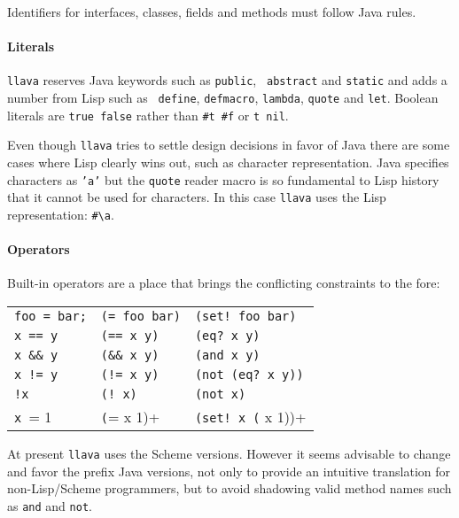 \documentclass{acm-final/sig-alternate-modified}
\begin{document}
Identifiers for interfaces, classes, fields and methods must follow
Java rules.

\paragraph{Literals}

{\tt llava} reserves Java keywords such as {\tt public}, {\tt
abstract} and {\tt static} and adds a number from Lisp such as {\tt
define}, {\tt defmacro}, {\tt lambda}, {\tt quote} and {\tt let}.
Boolean literals are {\tt true false} rather than {\tt \#t \#f} or
{\tt t nil}.

Even though {\tt llava} tries to settle design decisions in favor of
Java there are some cases where Lisp clearly wins out, such as
character representation.  Java specifies characters as {\tt 'a'} but
the {\tt quote} reader macro is so fundamental to Lisp history that it
cannot be used for characters.  In this case {\tt llava} uses the Lisp
representation: \verb+#\a+.

\paragraph{Operators}

Built-in operators are a place that brings the conflicting constraints
to the fore:

\small
\begin{tabular}{l|l|l}
\verb+foo = bar;+        & \verb+(= foo bar)+      & \verb+(set! foo bar)+ \\
\verb+x == y+            & \verb+(== x y)+         & \verb+(eq? x y)+ \\
\verb+x && y+            & \verb+(&& x y)+         & \verb+(and x y)+ \\
\verb+x != y+            & \verb+(!= x y)+         & \verb+(not (eq? x y))+ \\
\verb+!x+                & \verb+(! x)+            & \verb+(not x)+ \\
\verb+x += 1             & \verb+(+= x 1)+         & \verb+(set! x (+ x 1))+\\
\end{tabular}
\normalsize

At present {\tt llava} uses the Scheme versions.  However it seems
advisable to change and favor the prefix Java versions, not only to
provide an intuitive translation for non-Lisp/Scheme programmers, but
to avoid shadowing valid method names such as {\tt and} and {\tt not}.
\end{document}
